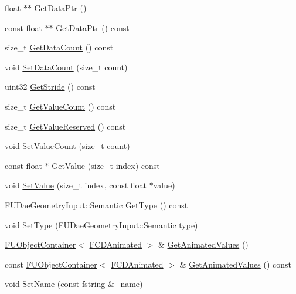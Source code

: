 \begin{DoxyCompactItemize}
\item 
float $\ast$$\ast$ \hyperlink{classFCDGeometrySource_a902252a6cba269b85c933ee8cc3c9755}{GetDataPtr} ()
\item 
const float $\ast$$\ast$ \hyperlink{classFCDGeometrySource_a91b9f12b26795439637bc59498c4334e}{GetDataPtr} () const 
\item 
size\_\-t \hyperlink{classFCDGeometrySource_ad758049fb9d2a7dc8950ecadc2dd8cbc}{GetDataCount} () const 
\item 
void \hyperlink{classFCDGeometrySource_a6e363fb7c4ab24adc86a6c84e32c79c1}{SetDataCount} (size\_\-t count)
\item 
uint32 \hyperlink{classFCDGeometrySource_a7dcebe0cf5ce917044a08b76df5e20a0}{GetStride} () const 
\item 
size\_\-t \hyperlink{classFCDGeometrySource_a32044849fd334877d739eb2c5177a182}{GetValueCount} () const 
\item 
size\_\-t \hyperlink{classFCDGeometrySource_a81d3ea07195965e947e8bb132b2719ce}{GetValueReserved} () const 
\item 
void \hyperlink{classFCDGeometrySource_ae60c3542035bc651c4cd76de926e97da}{SetValueCount} (size\_\-t count)
\item 
const float $\ast$ \hyperlink{classFCDGeometrySource_a48d19574bd5fc73ab935a357d42334e2}{GetValue} (size\_\-t index) const 
\item 
void \hyperlink{classFCDGeometrySource_a5221f77080c27478b7ad92aa50aee88a}{SetValue} (size\_\-t index, const float $\ast$value)
\item 
\hyperlink{namespaceFUDaeGeometryInput_a0f887d29f54b10338ebcf73789a7a061}{FUDaeGeometryInput::Semantic} \hyperlink{classFCDGeometrySource_ade05c553563ec84625cd8351da4d952b}{GetType} () const 
\item 
void \hyperlink{classFCDGeometrySource_ae98809e1d73eab01671c853020e18604}{SetType} (\hyperlink{namespaceFUDaeGeometryInput_a0f887d29f54b10338ebcf73789a7a061}{FUDaeGeometryInput::Semantic} type)
\item 
\hyperlink{classFUObjectContainer}{FUObjectContainer}$<$ \hyperlink{classFCDAnimated}{FCDAnimated} $>$ \& \hyperlink{classFCDGeometrySource_aa09bb6623337764f8371a66fdddf322d}{GetAnimatedValues} ()
\item 
const \hyperlink{classFUObjectContainer}{FUObjectContainer}$<$ \hyperlink{classFCDAnimated}{FCDAnimated} $>$ \& \hyperlink{classFCDGeometrySource_a2e8125a8f7974d40c7153a34ad743ea2}{GetAnimatedValues} () const 
\item 
void \hyperlink{classFCDGeometrySource_a8e9469c35a0e45c15407b63387fc1aa6}{SetName} (const \hyperlink{classfm_1_1stringT}{fstring} \&\_\-name)

\end{DoxyCompactItemize}
